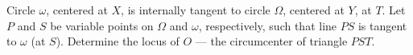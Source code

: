 Circle $\omega$, centered at $X$, is internally tangent to circle $\Omega$, centered at $Y$, at $T$.  Let $P$ and $S$ be variable points on $\Omega$ and $\omega$, respectively, such that line $PS$ is tangent to $\omega$ (at $S$).  Determine the locus of $O$ --- the circumcenter of triangle $PST$.
